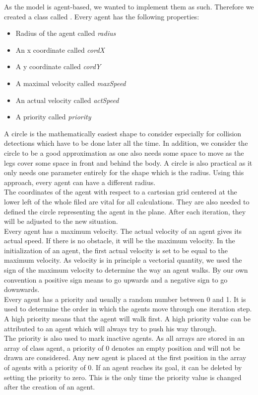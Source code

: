 
As the model is agent-based, we wanted to implement them as such. Therefore we created a class called . Every agent has the following properties:
\begin{itemize}
	\item Radius of the agent called \textit{radius}
	\item An x coordinate called \textit{cordX}
	\item A y coordinate called \textit{cordY}
	\item A maximal velocity called \textit{maxSpeed}
	\item An actual velocity called \textit{actSpeed}
	\item A priority called \textit{priority}
\end{itemize}
\noi A circle is the mathematically easiest shape to consider especially for collision detections which have to be done later all the time. In addition, we consider the circle to be a good approximation as one also needs some space to move as the legs cover some space in front and behind the body. A circle is also practical as it only needs one parameter entirely for the shape which is the radius. Using this approach, every agent can have a different radius.\\

\noi The coordinates of the agent with respect to a cartesian grid centered at the lower left of the whole filed are vital for all calculations. They are also needed to defined the circle representing the agent in the plane. After each iteration, they will be adjusted to the new situation.\\

\noi Every agent has a maximum velocity. The actual velocity of an agent gives its actual speed. If there is no obstacle, it will be the maximum velocity. In the initialization of an agent, the first actual velocity is set to be equal to the maximum velocity. As velocity is in principle a vectorial quantity, we used the sign of the maximum velocity to determine the way an agent walks. By our own convention a positive sign means to go upwards and a negative sign to go downwards.\\

\noi Every agent has a priority and usually a random number between 0 and 1. It is used to determine the order in which the agents move through one iteration step. A high priority means that the agent will walk first. A high priority value can be attributed to an agent which will always try to push his way through.\\
The priority is also used to mark inactive agents. As all arrays are stored in an array of class agent, a priority of 0 denotes an empty position and will not be drawn are considered. Any new agent is placed at the first position in the array of agents with a priority of 0. If an agent reaches its goal, it can be deleted by setting the priority to zero. This is the only time the priority value is changed after the creation of an agent.\\

